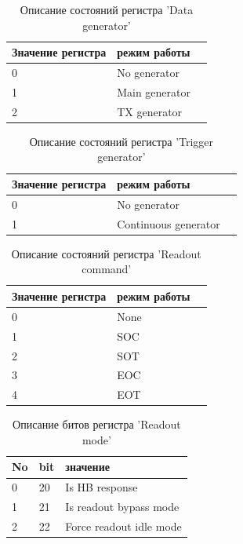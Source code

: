 \documentclass{article}
\begin{document}
\begin{table}[H]
\centering
\begin{tabular}{| l | l | l |}
\hline
Значение регистра & режим работы \\ \hline
0 & No generator \\ \hline
1 & Main generator \\ \hline
2 & TX generator \\ \hline
\end{tabular}
\caption{Описание состояний регистра 'Data generator'\label{tab4}}
\end{table}


\begin{table}[H]
\centering
\begin{tabular}{| l | l | l |}
\hline
Значение регистра & режим работы \\ \hline
0 & No generator \\ \hline
1 & Continuous generator \\ \hline
\end{tabular}
\caption{Описание состояний регистра 'Trigger generator'\label{tab5}}
\end{table}


\begin{table}[H]
\centering
\begin{tabular}{| l | l | l |}
\hline
Значение регистра & режим работы \\ \hline
0 & None \\ \hline
1 & SOC \\ \hline
2 & SOT \\ \hline
3 & EOC \\ \hline
4 & EOT \\ \hline
\end{tabular}
\caption{Описание состояний регистра 'Readout command'\label{tab6}}
\end{table}


\begin{table}[H]
\centering
\begin{tabular}{| l | l | l |}
\hline
No & bit & значение \\ \hline
0 & 20 & Is HB response \\ \hline
1 & 21 & Is readout bypass mode \\ \hline
2 & 22 & Force readout idle mode \\ \hline
\end{tabular}
\caption{Описание битов регистра 'Readout mode'\label{tab7}}
\end{table}
\end{document}
